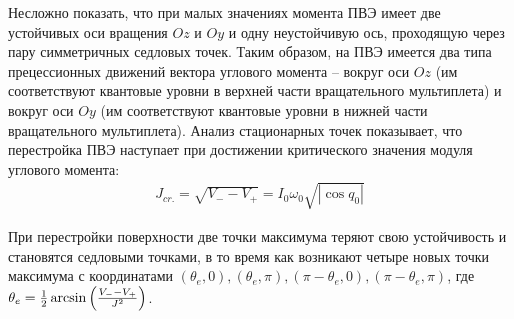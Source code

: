 Несложно показать, что при малых значениях момента ПВЭ имеет две устойчивых оси вращения $Oz$ и $Oy$ и одну неустойчивую ось, проходящую через пару симметричных седловых точек. Таким образом, на ПВЭ имеется два типа прецессионных движений вектора углового момента -- вокруг оси $Oz$ (им соответствуют квантовые уровни в верхней части вращательного мультиплета) и вокруг оси $Oy$ (им соответствуют квантовые уровни в нижней части вращательного мультиплета). Анализ стационарных точек показывает, что перестройка ПВЭ наступает при достижении критического значения модуля углового момента:
\vverh
\begin{gather}
J_{cr.} = \sqrt{V_{-} - V_{+}} = I_0 \omega_0 \sqrt{|\cos q_0|} \label{critical_moment}
\end{gather}

При перестройки поверхности две точки максимума теряют свою устойчивость и становятся седловыми точками, в то время как возникают четыре новых точки максимума с координатами $(\theta_e, 0), (\theta_e, \pi), (\pi - \theta_e, 0), (\pi - \theta_e, \pi)$, где $\theta_e =\frac{1}{2} \arcsin \left( \frac{V_{-} - V_{+}}{J^2} \right) $. 